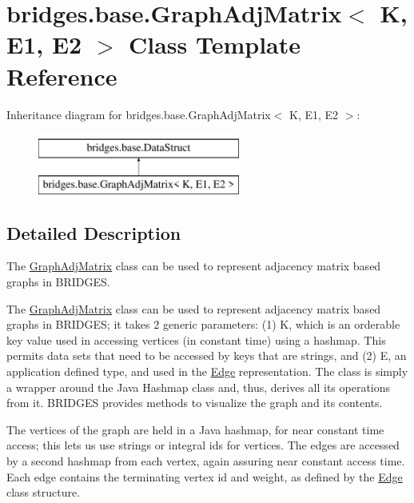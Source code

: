 \hypertarget{classbridges_1_1base_1_1_graph_adj_matrix}{}\section{bridges.\+base.\+Graph\+Adj\+Matrix$<$ K, E1, E2 $>$ Class Template Reference}
\label{classbridges_1_1base_1_1_graph_adj_matrix}
Inheritance diagram for bridges.\+base.\+Graph\+Adj\+Matrix$<$ K, E1, E2 $>$\+:\begin{figure}[H]
\begin{center}
\leavevmode
\includegraphics[height=2.000000cm]{classbridges_1_1base_1_1_graph_adj_matrix}
\end{center}
\end{figure}


\subsection{Detailed Description}
The \mbox{\hyperlink{classbridges_1_1base_1_1_graph_adj_matrix}{Graph\+Adj\+Matrix}} class can be used to represent adjacency matrix based graphs in B\+R\+I\+D\+G\+ES. 

The \mbox{\hyperlink{classbridges_1_1base_1_1_graph_adj_matrix}{Graph\+Adj\+Matrix}} class can be used to represent adjacency matrix based graphs in B\+R\+I\+D\+G\+ES; it takes 2 generic parameters\+: (1) K, which is an orderable key value used in accessing vertices (in constant time) using a hashmap. This permits data sets that need to be accessed by keys that are strings, and (2) E, an application defined type, and used in the \mbox{\hyperlink{classbridges_1_1base_1_1_edge}{Edge}} representation. The class is simply a wrapper around the Java Hashmap class and, thus, derives all its operations from it. B\+R\+I\+D\+G\+ES provides methods to visualize the graph and its contents.

The vertices of the graph are held in a Java hashmap, for near constant time access; this lets us use strings or integral ids for vertices. The edges are accessed by a second hashmap from each vertex, again assuring near constant access time. Each edge contains the terminating vertex id and weight, as defined by the \mbox{\hyperlink{classbridges_1_1base_1_1_edge}{Edge}} class structure.

